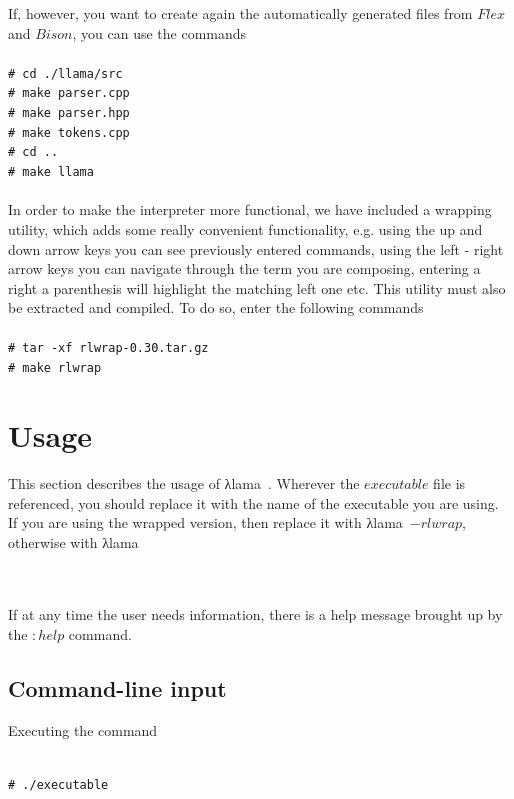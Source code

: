 \documentclass[a4paper]{article}
\newcommand{\shellcmd}[1]{\indent\indent\texttt{\footnotesize\# #1}}
\newcommand{\intr}{\textgreek{λ}lama\ }
\begin{document}
If, however, you want to create again the automatically generated files from $Flex$ and $Bison$, you can use the commands
~\\ \\
\shellcmd{cd ./llama/src}~\\
\shellcmd{make parser.cpp}\\
\shellcmd{make parser.hpp}\\
\shellcmd{make tokens.cpp}\\
\shellcmd{cd ..}\\
\shellcmd{make llama}\\
\\

In order to make the interpreter more functional, we have included a wrapping utility, which adds some really convenient functionality, e.g. using the up and down arrow keys you can see previously entered commands, using the left - right arrow keys you can navigate through the term you are composing, entering a right a parenthesis will highlight the matching left one etc. This utility must also be extracted and compiled. To do so, enter the following commands
\\ \\
\shellcmd{tar -xf rlwrap-0.30.tar.gz} \\
\shellcmd{make rlwrap}
\\
\section{Usage}

This section describes the usage of \intr . Wherever the $executable$ file is referenced, you should replace it with the name of the executable you are using. If you are using the wrapped version, then replace it with \intr$-rlwrap$, otherwise with \intr

~\\ \\ 

If at any time the user needs information, there is a help message brought up by the $:help$ command.

\subsection{Command-line input}

Executing the command 

~\\ 
\shellcmd{./executable}
\\ 
\end{document}
